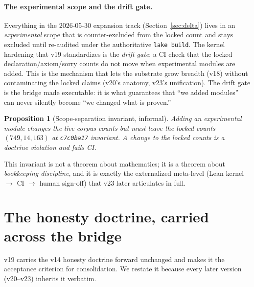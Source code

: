 \documentclass[11pt]{article}
\theoremstyle{plain}
\newtheorem{proposition}[theorem]{Proposition}
\theoremstyle{definition}
\theoremstyle{remark}
\begin{document}
\paragraph{The experimental scope and the drift gate.}
Everything in the 2026-05-30 expansion track (Section~\ref{sec:delta}) lives in an
\emph{experimental} scope that is counter-excluded from the locked count and stays
excluded until re-audited under the authoritative \texttt{lake build}. The kernel
hardening that v19 standardizes is the \emph{drift gate}: a CI check that the locked
declaration/axiom/sorry counts do not move when experimental modules are added. This
is the mechanism that lets the substrate grow breadth (v18) without contaminating the
locked claims (v20's anatomy, v23's unification). The drift gate is the bridge made
executable: it is what guarantees that ``we added modules'' can never silently become
``we changed what is proven.''

\begin{proposition}[Scope-separation invariant, informal]
Adding an experimental module changes the \emph{live} corpus counts but must leave the
\emph{locked} counts $(749,14,163)$ at \texttt{c7c0ba17} invariant. A change to the
locked counts is a doctrine violation and fails CI.
\end{proposition}

This invariant is not a theorem about mathematics; it is a theorem about
\emph{bookkeeping discipline}, and it is exactly the externalized meta-level
(Lean kernel $\to$ CI $\to$ human sign-off) that v23 later articulates in full.

\section{The honesty doctrine, carried across the bridge}
\label{sec:honesty}

v19 carries the v14 honesty doctrine forward unchanged and makes it the acceptance
criterion for consolidation. We restate it because every later version (v20--v23)
inherits it verbatim.
\end{document}
